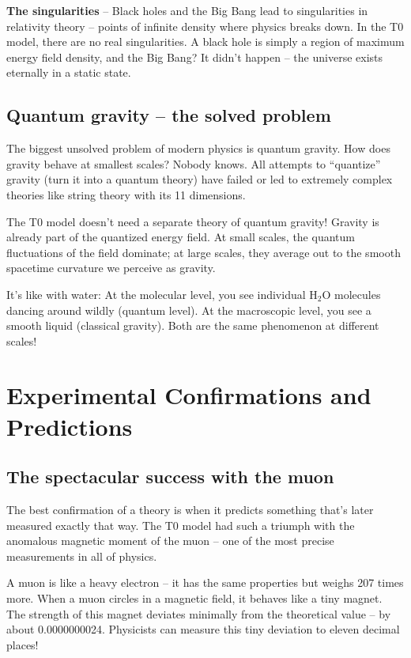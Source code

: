 	\textbf{The singularities} -- Black holes and the Big Bang lead to singularities in relativity theory -- points of infinite density where physics breaks down. In the T0 model, there are no real singularities. A black hole is simply a region of maximum energy field density, and the Big Bang? It didn't happen -- the universe exists eternally in a static state.
	
	\subsection{Quantum gravity -- the solved problem}
	
	The biggest unsolved problem of modern physics is quantum gravity. How does gravity behave at smallest scales? Nobody knows. All attempts to ``quantize'' gravity (turn it into a quantum theory) have failed or led to extremely complex theories like string theory with its 11 dimensions.
	
	\begin{important}
		The T0 model doesn't need a separate theory of quantum gravity! Gravity is already part of the quantized energy field. At small scales, the quantum fluctuations of the field dominate; at large scales, they average out to the smooth spacetime curvature we perceive as gravity.
		
		It's like with water: At the molecular level, you see individual H$_2$O molecules dancing around wildly (quantum level). At the macroscopic level, you see a smooth liquid (classical gravity). Both are the same phenomenon at different scales!
	\end{important}
	
	\section{Experimental Confirmations and Predictions}
	
	\subsection{The spectacular success with the muon}
	
	The best confirmation of a theory is when it predicts something that's later measured exactly that way. The T0 model had such a triumph with the anomalous magnetic moment of the muon -- one of the most precise measurements in all of physics.
	
	A muon is like a heavy electron -- it has the same properties but weighs 207 times more. When a muon circles in a magnetic field, it behaves like a tiny magnet. The strength of this magnet deviates minimally from the theoretical value -- by about 0.0000000024. Physicists can measure this tiny deviation to eleven decimal places!
	
